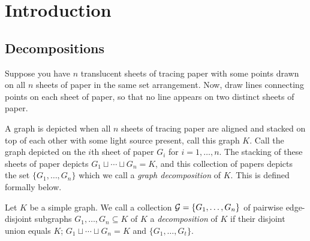 \chapter{Introduction} \label{chap:intro}
\label{intro_chapter}
\section{Decompositions}
Suppose you have $n$ translucent sheets of tracing paper with some points drawn on all $n$ sheets of paper in the same set arrangement. Now, draw lines connecting points on each sheet of paper, so that no line appears on two distinct sheets of paper.

A graph is depicted when all $n$ sheets of tracing paper are aligned and stacked on top of each other with some light source present, call this graph $K$. Call the graph depicted on the $i$th sheet of paper $G_{i}$ for $i=1,\hdots,n$. The stacking of these sheets of paper depicts $G_{1}\sqcup \cdots \sqcup G_{n}=K$, and this collection of papers depicts the set $\{G_{1},\hdots,G_{n}\}$ which we call a \textit{graph decomposition} of $K$. This is defined formally below.

\begin{definition}
Let $K$ be a simple graph. We call a collection $\mathcal{G}=\{G_{1},\hdots,G_{n}\}$ of pairwise edge-disjoint subgraphs $G_{1},\hdots,G_{n}\subseteq K$ of $K$ a \textit{decomposition} of $K$ if their disjoint union equals $K$; $G_{1}\sqcup \cdots \sqcup G_{n}=K$ and $\{G_{1},\hdots, G_{t}\}$.
\end{definition}


